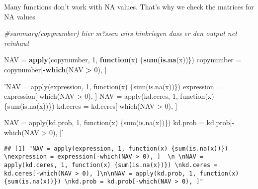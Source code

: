 \documentclass[]{article}
\newenvironment{Shaded}{\begin{snugshade}}{\end{snugshade}}
\newcommand{\CommentTok}[1]{\textcolor[rgb]{0.56,0.35,0.01}{\textit{#1}}}
\newcommand{\ControlFlowTok}[1]{\textcolor[rgb]{0.13,0.29,0.53}{\textbf{#1}}}
\newcommand{\DecValTok}[1]{\textcolor[rgb]{0.00,0.00,0.81}{#1}}
\newcommand{\KeywordTok}[1]{\textcolor[rgb]{0.13,0.29,0.53}{\textbf{#1}}}
\newcommand{\NormalTok}[1]{#1}
\newcommand{\OperatorTok}[1]{\textcolor[rgb]{0.81,0.36,0.00}{\textbf{#1}}}
\newcommand{\StringTok}[1]{\textcolor[rgb]{0.31,0.60,0.02}{#1}}
\begin{document}
\begin{Shaded}
\end{Shaded}

Many functions don't work with NA values. That's why we check the
matrices for NA values

\begin{Shaded}
\begin{Highlighting}[]
\CommentTok{#summary(copynumber) hier m?ssen wirs hinkriegen dass er den output net reinhaut}


\NormalTok{NAV =}\StringTok{ }\KeywordTok{apply}\NormalTok{(copynumber, }\DecValTok{1}\NormalTok{, }\ControlFlowTok{function}\NormalTok{(x) \{}\KeywordTok{sum}\NormalTok{(}\KeywordTok{is.na}\NormalTok{(x))\}) }
\NormalTok{copynumber =}\StringTok{ }\NormalTok{copynumber[}\OperatorTok{-}\KeywordTok{which}\NormalTok{(NAV }\OperatorTok{>}\StringTok{ }\DecValTok{0}\NormalTok{), ]  }

\StringTok{'NAV = apply(expression, 1, function(x) \{sum(is.na(x))\}) }
\StringTok{expression = expression[-which(NAV > 0), ]  }
\StringTok{ }
\StringTok{NAV = apply(kd.ceres, 1, function(x) \{sum(is.na(x))\}) }
\StringTok{kd.ceres = kd.ceres[-which(NAV > 0), ]}

\StringTok{NAV = apply(kd.prob, 1, function(x) \{sum(is.na(x))\}) }
\StringTok{kd.prob = kd.prob[-which(NAV > 0), ]'}
\end{Highlighting}
\end{Shaded}

\begin{verbatim}
## [1] "NAV = apply(expression, 1, function(x) {sum(is.na(x))}) \nexpression = expression[-which(NAV > 0), ]  \n \nNAV = apply(kd.ceres, 1, function(x) {sum(is.na(x))}) \nkd.ceres = kd.ceres[-which(NAV > 0), ]\n\nNAV = apply(kd.prob, 1, function(x) {sum(is.na(x))}) \nkd.prob = kd.prob[-which(NAV > 0), ]"
\end{verbatim}
\end{document}
